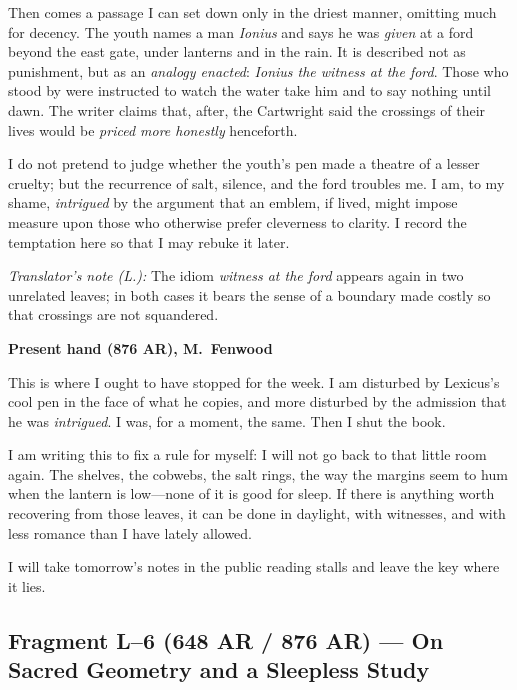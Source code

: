 \documentclass[11pt]{article}
\begin{document}
Then comes a passage I can set down only in the driest manner, omitting much for decency. The youth names a man \textit{Ionius} and says he was \emph{given} at a ford beyond the east gate, under lanterns and in the rain. It is described not as punishment, but as an \emph{analogy enacted}: \textit{Ionius the witness at the ford}. Those who stood by were instructed to watch the water take him and to say nothing until dawn. The writer claims that, after, the Cartwright said the crossings of their lives would be \emph{priced more honestly} henceforth.

I do not pretend to judge whether the youth’s pen made a theatre of a lesser cruelty; but the recurrence of salt, silence, and the ford troubles me. I am, to my shame, \emph{intrigued} by the argument that an emblem, if lived, might impose measure upon those who otherwise prefer cleverness to clarity. I record the temptation here so that I may rebuke it later.

\medskip
\noindent\textit{Translator’s note (L.):} The idiom \textit{witness at the ford} appears again in two unrelated leaves; in both cases it bears the sense of a boundary made costly so that crossings are not squandered.

\medskip
\noindent\textbf{Present hand (876 AR), M.\ Fenwood}

This is where I ought to have stopped for the week. I am disturbed by Lexicus’s cool pen in the face of what he copies, and more disturbed by the admission that he was \emph{intrigued}. I was, for a moment, the same. Then I shut the book.

I am writing this to fix a rule for myself: I will not go back to that little room again. The shelves, the cobwebs, the salt rings, the way the margins seem to hum when the lantern is low—none of it is good for sleep. If there is anything worth recovering from those leaves, it can be done in daylight, with witnesses, and with less romance than I have lately allowed. 

I will take tomorrow’s notes in the public reading stalls and leave the key where it lies.

\subsection{Fragment L--6 (648 AR / 876 AR) --- On Sacred Geometry and a Sleepless Study}
\label{frag:l6}
{}
\end{document}
